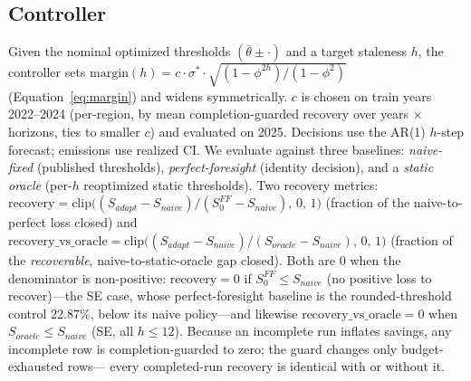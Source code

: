 \documentclass[sigconf,nonacm=false]{acmart}
\begin{document}
\subsection{Controller}
Given the nominal optimized thresholds $(\bar\theta\pm \cdot)$ and a target
staleness $h$, the controller sets
$\mathrm{margin}(h)=c\cdot\sigma^*\cdot\sqrt{(1-\phi^{2h})/(1-\phi^2)}$
(Equation~\ref{eq:margin}) and widens symmetrically. $c$ is chosen on train
years 2022--2024 (per-region, by mean completion-guarded recovery over years
$\times$ horizons, ties to smaller $c$) and evaluated on 2025. Decisions use
the AR(1) $h$-step forecast; emissions use realized CI. We evaluate against
three baselines: \emph{naive-fixed} (published thresholds),
\emph{perfect-foresight} (identity decision), and a \emph{static oracle}
(per-$h$ reoptimized static thresholds). Two recovery metrics:
$\mathrm{recovery} =
\mathrm{clip}\big((S_{adapt}-S_{naive})/(S_{0}^{FF}-S_{naive}),\,0,\,1\big)$
(fraction of the naive-to-perfect loss closed) and
$\mathrm{recovery\_vs\_oracle} =
\mathrm{clip}\big((S_{adapt}-S_{naive})/(S_{oracle}-S_{naive}),\,0,\,1\big)$
(fraction of the \emph{recoverable}, naive-to-static-oracle gap closed). Both
are $0$ when the denominator is non-positive: $\mathrm{recovery}=0$ if
$S_{0}^{FF}\le S_{naive}$ (no positive loss to recover)---the SE case, whose
perfect-foresight baseline is the rounded-threshold control 22.87\%, below its
naive policy---and likewise
$\mathrm{recovery\_vs\_oracle}=0$ when $S_{oracle}\le S_{naive}$ (SE, all
$h\le12$). Because an incomplete run inflates savings, any incomplete row is
completion-guarded to zero; the guard changes only budget-exhausted rows---
every completed-run recovery is identical with or without it.
\end{document}
